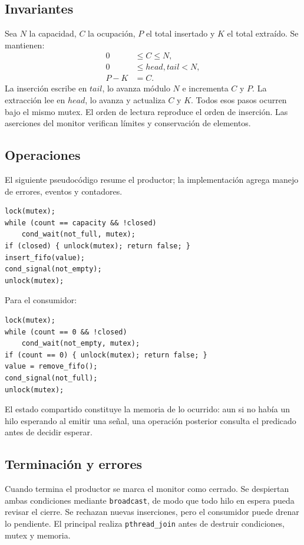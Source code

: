 \documentclass[conference]{IEEEtran}
\begin{document}
\subsection{Invariantes}
Sea $N$ la capacidad, $C$ la ocupación, $P$ el total insertado y $K$ el total
extraído. Se mantienen:
\begin{align}
0 &\leq C \leq N,\\
0 &\leq head,tail < N,\\
P-K &= C.
\end{align}
La inserción escribe en $tail$, lo avanza módulo $N$ e incrementa $C$ y $P$.
La extracción lee en $head$, lo avanza y actualiza $C$ y $K$. Todos esos pasos
ocurren bajo el mismo mutex. El orden de lectura reproduce el orden de inserción.
Las aserciones del monitor verifican límites y conservación de elementos.

\subsection{Operaciones}
El siguiente pseudocódigo resume el productor; la implementación agrega manejo
de errores, eventos y contadores.
\begin{lstlisting}
lock(mutex);
while (count == capacity && !closed)
    cond_wait(not_full, mutex);
if (closed) { unlock(mutex); return false; }
insert_fifo(value);
cond_signal(not_empty);
unlock(mutex);
\end{lstlisting}
Para el consumidor:
\begin{lstlisting}
lock(mutex);
while (count == 0 && !closed)
    cond_wait(not_empty, mutex);
if (count == 0) { unlock(mutex); return false; }
value = remove_fifo();
cond_signal(not_full);
unlock(mutex);
\end{lstlisting}
El estado compartido constituye la memoria de lo ocurrido: aun si no había un
hilo esperando al emitir una señal, una operación posterior consulta el predicado
antes de decidir esperar.

\subsection{Terminación y errores}
Cuando termina el productor se marca el monitor como cerrado. Se despiertan ambas
condiciones mediante \texttt{broadcast}, de modo que todo hilo en espera pueda
revisar el cierre. Se rechazan nuevas inserciones, pero el consumidor puede drenar
lo pendiente. El principal realiza \texttt{pthread\_join} antes de destruir
condiciones, mutex y memoria.
\end{document}
